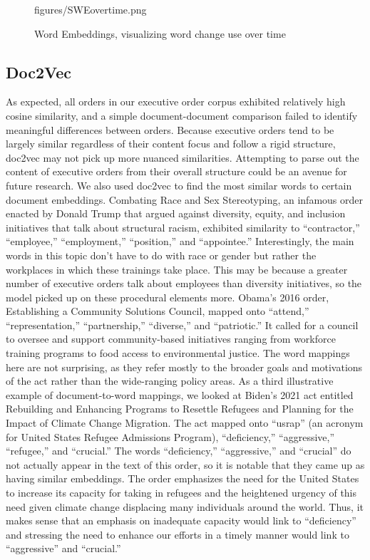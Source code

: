 \documentclass{article}
\begin{document}
{\begin{figure}[H]
{		{figures/SWEovertime.png}}
	\caption{\label{fig:my-label7} Word Embeddings, visualizing word change use over time}
\end{figure}

\subsection{Doc2Vec}{As expected, all orders in our executive order corpus exhibited relatively high cosine similarity, and a simple document-document comparison failed to identify meaningful differences between orders. Because executive orders tend to be largely similar regardless of their content focus and follow a rigid structure, doc2vec may not pick up more nuanced similarities. Attempting to parse out the content of executive orders from their overall structure could be an avenue for future research. 
We also used doc2vec to find the most similar words to certain document embeddings. Combating Race and Sex Stereotyping, an infamous order enacted by Donald Trump that argued against diversity, equity, and inclusion initiatives that talk about structural racism, exhibited similarity to “contractor,” “employee,” “employment,” “position,” and “appointee.” Interestingly, the main words in this topic don’t have to do with race or gender but rather the workplaces in which these trainings take place. This may be because a greater number of executive orders talk about employees than diversity initiatives, so the model picked up on these procedural elements more. 
Obama’s 2016 order, Establishing a Community Solutions Council, mapped onto “attend,” “representation,” “partnership,” “diverse,” and “patriotic.” It called for a council to oversee and support community-based initiatives ranging from workforce training programs to food access to environmental justice. The word mappings here are not surprising, as they refer mostly to the broader goals and motivations of the act rather than the wide-ranging policy areas. 
As a third illustrative example of document-to-word mappings, we looked at Biden’s 2021 act entitled Rebuilding and Enhancing Programs to Resettle Refugees and Planning for the Impact of Climate Change Migration. The act mapped onto “usrap” (an acronym for United States Refugee Admissions Program), “deficiency,” “aggressive,” “refugee,” and “crucial.” The words “deficiency,” “aggressive,” and “crucial” do not actually appear in the text of this order, so it is notable that they came up as having similar embeddings. The order emphasizes the need for the United States to increase its capacity for taking in refugees and the heightened urgency of this need given climate change displacing many individuals around the world. Thus, it makes sense that an emphasis on inadequate capacity would link to “deficiency” and stressing the need to enhance our efforts in a timely manner would link to “aggressive” and “crucial.” 
}}
\end{document}
